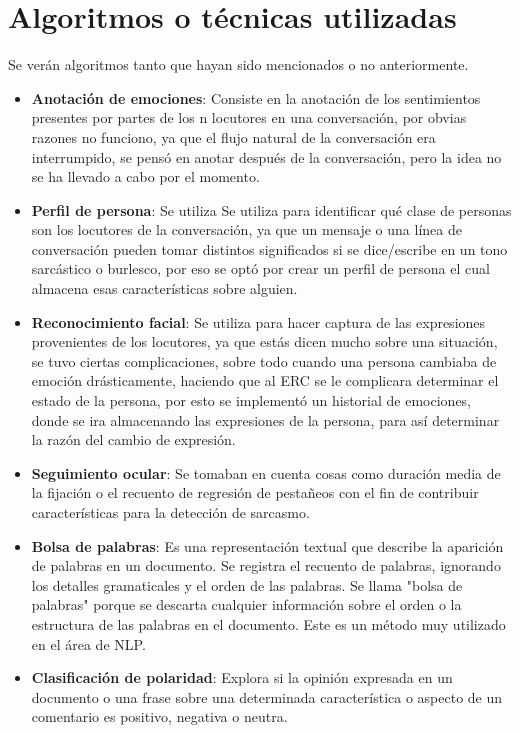 \documentclass[conference]{IEEEtran}
\begin{document}
\section{Algoritmos o técnicas utilizadas}
Se verán algoritmos tanto que hayan sido mencionados o no anteriormente.
\begin{itemize}
  \item \textbf{Anotación de emociones}: Consiste en la anotación de los sentimientos presentes por partes de los n locutores en una conversación, por obvias razones no funciono, ya que el flujo natural de la conversación era interrumpido, se pensó en anotar después de la conversación, pero la idea no se ha llevado a cabo por el momento.
  \item \textbf{Perfil de persona}: Se utiliza Se utiliza para identificar qué clase de personas son los locutores de la conversación, ya que un mensaje o una línea de conversación pueden tomar distintos significados si se dice/escribe en un tono sarcástico o burlesco, por eso se optó por crear un perfil de persona el cual almacena esas características sobre alguien. 
  \item \textbf{Reconocimiento facial}: Se utiliza para hacer captura de las expresiones provenientes de los locutores, ya que estás dicen mucho sobre una situación, se tuvo ciertas complicaciones, sobre todo cuando una persona cambiaba de emoción drásticamente, haciendo que al ERC se le complicara determinar el estado de la persona, por esto se implementó un historial de emociones, donde se ira almacenando las expresiones de la persona, para así determinar la razón del cambio de expresión.
  \item \textbf{Seguimiento ocular}: Se tomaban en cuenta cosas como duración media de la fijación o el recuento de regresión de pestañeos con el fin de contribuir características para la detección de sarcasmo.
\item \textbf{Bolsa de palabras}: Es una representación textual que describe la aparición de palabras en un documento. Se registra el recuento de palabras, ignorando los detalles gramaticales y el orden de las palabras. Se llama "bolsa de palabras" porque se descarta cualquier información sobre el orden o la estructura de las palabras en el documento. Este es un método muy utilizado en el área de NLP.
  \item \textbf{Clasificación de polaridad}: Explora si la opinión expresada en un documento o una frase sobre una determinada característica o aspecto de un comentario es positivo, negativa o neutra. 


\end{itemize}
\end{document}
